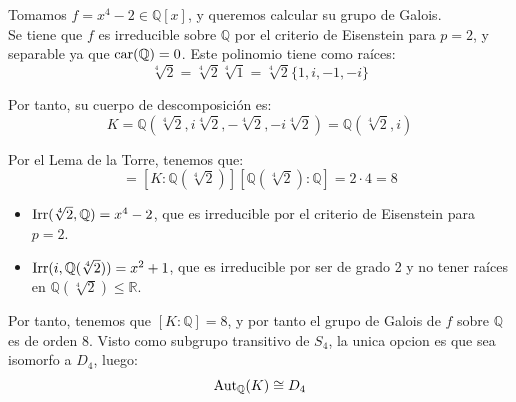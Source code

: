 \begin{ejercicio}
    Tomamos $f=x^4-2\in \mathbb{Q}[x]$, y queremos calcular su grupo de Galois.\\
    
    Se tiene que $f$ es irreducible sobre $\mathbb{Q}$ por el criterio de Eisenstein para $p=2$, y separable ya que $\operatorname{car}(\mathbb{Q}) = 0$. Este polinomio tiene como raíces:
    \begin{equation*}
        \sqrt[4]{2}=\sqrt[4]{2}\sqrt[4]{1} = \sqrt[4]{2}\{1,i,-1,-i\}
    \end{equation*}

    Por tanto, su cuerpo de descomposición es:
    \begin{equation*}
        K = \mathbb{Q}(\sqrt[4]{2}, i\sqrt[4]{2}, -\sqrt[4]{2}, -i\sqrt[4]{2}) = \mathbb{Q}(\sqrt[4]{2}, i)
    \end{equation*}

    Por el Lema de la Torre, tenemos que:
    \begin{equation*}
        [K : \mathbb{Q}] = [K : \mathbb{Q}(\sqrt[4]{2})][\mathbb{Q}(\sqrt[4]{2}) : \mathbb{Q}] = 2\cdot 4 = 8
    \end{equation*}
    \begin{itemize}
        \item $\operatorname{Irr}(\sqrt[4]{2},\mathbb{Q}) = x^4-2$, que es irreducible por el criterio de Eisenstein para $p=2$.
        \item $\operatorname{Irr}(i,\mathbb{Q}(\sqrt[4]{2})) = x^2+1$, que es irreducible por ser de grado 2 y no tener raíces en $\mathbb{Q}(\sqrt[4]{2})\leq \mathbb{R}$.
    \end{itemize}

    Por tanto, tenemos que $[K : \mathbb{Q}] = 8$, y por tanto el grupo de Galois de $f$ sobre $\mathbb{Q}$ es de orden 8. Visto como subgrupo transitivo de $S_4$, la unica opcion es que sea isomorfo a $D_4$, luego:
    \begin{equation*}
        \operatorname{Aut}_{\mathbb{Q}}(K) \cong D_4
    \end{equation*}
\end{ejercicio}

